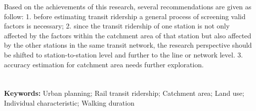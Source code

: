 \documentclass[12pt, twoside, a4paper]{book} %
\begin{document}
Based on the achievements of this research, several recommendations are given as follow: 1. before estimating transit ridership a general process of screening valid factors is necessary; 2. since the transit ridership of one station is not only affected by the factors within the catchment area of that station but also affected by the other stations in the same transit network, the research perspective should be shifted to station-to-station level and further to the line or network level. 3. accuracy estimation for catchment area needs further exploration. \\ \\ \\

\noindent %
\textbf{Keywords:} Urban planning; Rail transit ridership; Catchment area; Land use; Individual characteristic; Walking duration

\mainmatter %













% 
% 

\backmatter
% 
% 
% 
\end{document}
